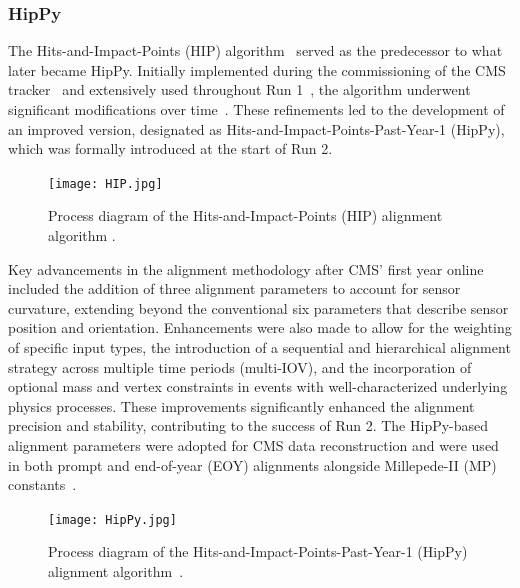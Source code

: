 
\subsubsection{HipPy}

The Hits-and-Impact-Points (HIP) algorithm~\cite{Karimaki:2003bd, Karimaki:926537} served as the predecessor to what later became HipPy. Initially implemented during the commissioning of the CMS tracker~\cite{WAdam_2009} and extensively used throughout Run 1~\cite{CMSCollaboration_2010, Chatrchyan:1667597}, the algorithm underwent significant modifications over time~\cite{BROWN2009467}. These refinements led to the development of an improved version, designated as Hits-and-Impact-Points-Past-Year-1 (HipPy), which was formally introduced at the start of Run 2. 

\begin{figure}[!hbt]
    \begin{center}
        \texttt{[image: HIP.jpg]}
        \caption{Process diagram of the Hits-and-Impact-Points (HIP) alignment algorithm \cite{2022166795}.}
        \label{fig:HIP}
    \end{center}
\end{figure}

Key advancements in the alignment methodology after CMS' first year online included the addition of three alignment parameters to account for sensor curvature, extending beyond the conventional six parameters that describe sensor position and orientation. Enhancements were also made to allow for the weighting of specific input types, the introduction of a sequential and hierarchical alignment strategy across multiple time periods (multi-IOV), and the incorporation of optional mass and vertex constraints in events with well-characterized underlying physics processes. These improvements significantly enhanced the alignment precision and stability, contributing to the success of Run 2. The HipPy-based alignment parameters were adopted for CMS data reconstruction and were used in both prompt and end-of-year (EOY) alignments alongside Millepede-II (MP) constants~\cite{BROWN2009467}. 

\begin{figure}[!hbt]
    \begin{center}
        \texttt{[image: HipPy.jpg]}
        \caption{Process diagram of the Hits-and-Impact-Points-Past-Year-1 (HipPy) alignment algorithm~\cite{2022166795}.}
        \label{fig:HipPy}
    \end{center}
\end{figure}

